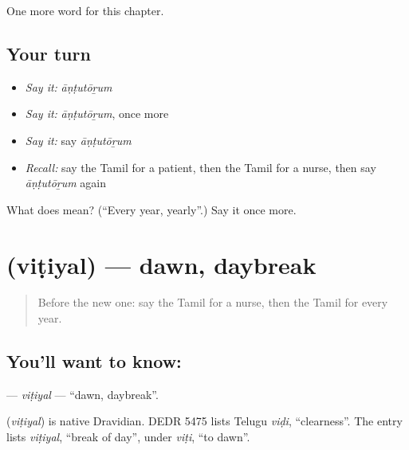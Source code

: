 \begin{grammarlens}[title={What you've built}]
One more word for this chapter.
\end{grammarlens}

\subsection*{Your turn}
\begin{itemize}
\raggedright
  \item \emph{Say it:} \emph{āṇṭutōṟum}
  \item \emph{Say it:} \emph{āṇṭutōṟum}, once more
  \item \emph{Say it:} say \emph{āṇṭutōṟum}
  \item \emph{Recall:} say the Tamil for a patient, then the Tamil for a nurse, then say \emph{āṇṭutōṟum} again
\end{itemize}

\begin{tcolorbox}[breakable,colback=teal!4,colframe=teal!35!black,title={Before you move on}]
What does  mean? (\textquotedblleft{}Every year, yearly\textquotedblright{}.) Say it once more.
\end{tcolorbox}
\section[\texorpdfstring{\ta{விடியல்} (viṭiyal)}{விடியல் (viṭiyal)}]{ (viṭiyal) — dawn, daybreak}

\label{lesson:TA-C233-vitiyal}



\begin{quote}
Before the new one: say the Tamil for a nurse, then the Tamil for every year.
\end{quote}

\subsection*{You'll want to know: }
\textbf{} — \emph{viṭiyal} — \textquotedblleft{}dawn, daybreak\textquotedblright{}.

\begin{cousinweb}
\textbf{} (\emph{viṭiyal}) is native Dravidian. DEDR 5475 lists Telugu \emph{viḍi}, \textquotedblleft{}clearness\textquotedblright{}. The entry lists \emph{viṭiyal}, \textquotedblleft{}break of day\textquotedblright{}, under \emph{viṭi}, \textquotedblleft{}to dawn\textquotedblright{}.
\end{cousinweb}

